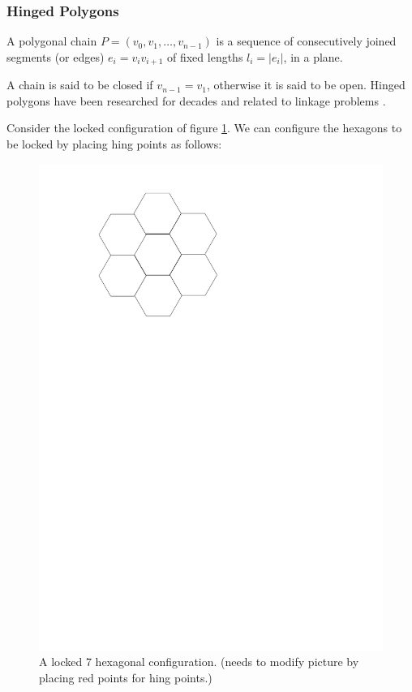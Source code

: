 \subsubsection{Hinged Polygons}
\begin{definition}\label{def}
A polygonal chain $P = \left( v_0, v_1, \dots, v_{n-1}\right) $ is a sequence of
consecutively joined segments (or edges) $e_i = v_i v_{i+1}$ of fixed lengths
$l_i = \left\vert e_i\right\vert $, in a plane. \cite{Biedl99lockedand}
\end{definition}
A chain is said to be closed if $v_{n-1} = v_1$, otherwise it is said to be
open. Hinged polygons have been researched for decades and related to linkage problems
\cite{Biedl99lockedand,canny1988complexity}.

 Consider the locked configuration of figure \ref{figure:7hexLocked}.  We can
 configure the hexagons to be locked by placing hing points as follows:
\begin{figure}[h]
\begin{center}
\includegraphics[scale=.33]{../graphics/7hexLocked.pdf}
\caption{A locked 7 hexagonal configuration.  (needs to modify picture by
placing red points for hing points.)}
\label{figure:7hexLocked}
\end{center} 
\end{figure}
